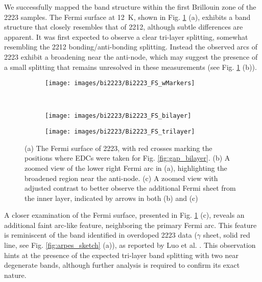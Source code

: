We successfully mapped the band structure within the first Brillouin zone of the 2223 samples.
The Fermi surface at \qty{12}{\kelvin}, shown in Fig. \ref{fig:bi2223_fs} (a), exhibits a band structure that closely resembles that of 2212, although subtle differences are apparent.
It was first expected to observe a clear tri-layer splitting, somewhat resembling the 2212 bonding/anti-bonding splitting.
Instead the observed arcs of 2223 exhibit a broadening near the anti-node, which may suggest the presence of a small splitting that remains unresolved in these measurements (see Fig. \ref{fig:bi2223_fs} (b)).

\begin{figure}[t!]
	\centering
	\begin{subfigure}[b]{0.6\textwidth}
		\texttt{[image: images/bi2223/Bi2223\_FS\_wMarkers]}
		\caption{}
	\end{subfigure}
	\\
	\begin{subfigure}[b]{0.6\textwidth}
		\texttt{[image: images/bi2223/Bi2223\_FS\_bilayer]}
		\caption{}
	\end{subfigure}
	\begin{subfigure}[b]{0.3\textwidth}
		\texttt{[image: images/bi2223/Bi2223\_FS\_trilayer]}
		\caption{}
	\end{subfigure}
	\caption{(a) The Fermi surface of 2223, with red crosses marking the positions where EDCs were taken for Fig. \ref{fig:gap_bilayer}. (b) A zoomed view of the lower right Fermi arc in (a), highlighting the broadened region near the anti-node. (c) A zoomed view with adjusted contrast to better observe the additional Fermi sheet from the inner  layer, indicated by arrows in both (b) and (c)}
	\label{fig:bi2223_fs}
\end{figure}

A closer examination of the Fermi surface, presented in Fig. \ref{fig:bi2223_fs} (c), reveals an additional faint arc-like feature, neighboring the primary Fermi arc.
This feature is reminiscent of the band identified in overdoped 2223 data ($\gamma$ sheet, solid red line, see Fig. \ref{fig:arpes_sketch} (a)), as reported by Luo et al. \cite{luo_electronic_2023}.
This observation hints at the presence of the expected tri-layer band splitting with two near degenerate bands, although further analysis is required to confirm its exact nature.

